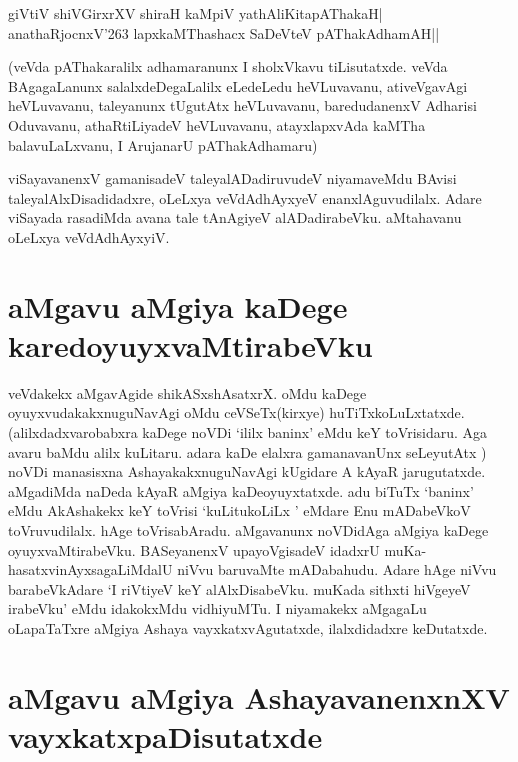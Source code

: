 \begin{shloka}
giVtiV shiVGirxrXV shiraH kaMpiV yathAliKitapAThakaH|\label{5}\\
anathaRjocnxV\char'263 lapxkaMThashacx SaDeVteV pAThakAdhamAH||
\end{shloka}

(veVda pAThakaralilx adhamaranunx  I sholxVkavu tiLisutatxde. veVda BAgagaLanunx  salalxdeDegaLalilx  eLedeLedu heVLuvavanu, ativeVgavAgi heVLuvavanu, taleyanunx  tUgutAtx heVLuvavanu, baredudanenxV Adharisi Oduvavanu, athaRtiLiyadeV heVLuvavanu, atayxlapxvAda kaMTha balavuLaLxvanu, I ArujanarU pAThakAdhamaru)

viSayavanenxV gamanisadeV taleyalADadiruvudeV niyamaveMdu BAvisi taleyalAlxDisadidadxre, oLeLxya veVdAdhAyxyeV enanxlAguvudilalx. Adare viSayada rasadiMda avana tale tAnAgiyeV alADadirabeVku. aMtahavanu oLeLxya veVdAdhAyxyiV.

\section*{aMgavu aMgiya kaDege karedoyuyxvaMtirabeVku}

veVdakekx  aMgavAgide shikASxshAsatxrX. oMdu kaDege oyuyxvudakakxnuguNavAgi oMdu ceVSeTx(kirxye) huTiTxkoLuLxtatxde. (alilxdadxvarobabxra kaDege noVDi `ililx baninx' eMdu keY toVrisidaru. Aga avaru baMdu alilx kuLitaru. adara kaDe elalxra gamanavanUnx  seLeyutAtx ) noVDi manasisxna AshayakakxnuguNavAgi kUgidare A kAyaR jarugutatxde. aMgadiMda naDeda kAyaR aMgiya kaDeoyuyxtatxde. adu biTuTx  `baninx' eMdu  AkAshakekx  keY toVrisi  `kuLitukoLiLx ' eMdare  Enu mADabeVkoV toVruvudilalx. hAge toVrisabAradu. aMgavanunx  noVDidAga aMgiya kaDege oyuyxvaMtirabeVku. BASeyanenxV upayoVgisadeV idadxrU muKa-hasatxvinAyxsagaLiMdalU  niVvu baruvaMte mADabahudu. Adare  hAge niVvu barabeVkAdare `I riVtiyeV keY alAlxDisabeVku. muKada sithxti  hiVgeyeV  irabeVku' eMdu idakokxMdu vidhiyuMTu. I niyamakekx  aMgagaLu oLapaTaTxre aMgiya Ashaya vayxkatxvAgutatxde, ilalxdidadxre keDutatxde.

\section*{aMgavu aMgiya AshayavanenxnXV vayxkatxpaDisutatxde}

